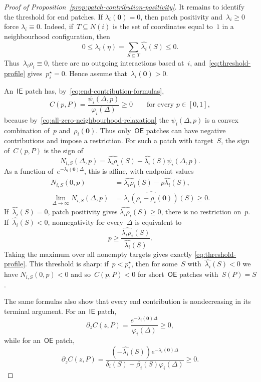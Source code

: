 \documentclass[EJP,preprint,NODS,nobera]{ejpecp}
\newcommand{\bb}[1]{\left(#1\right)}
\newcommand{\mb}[1]{\mathbf{#1}}
\begin{document}
\begin{proof}[Proof of Proposition~\ref{prop:patch-contribution-positivity}]
It remains to identify the threshold for end patches. If
$\lambda_i(\mb 0)=0$, then patch positivity and~$\lambda_i\geq0$ force
$\lambda_i\equiv0$. Indeed, if~$T\subseteq N(i)$ is the set of coordinates
equal to~$1$ in a neighbourhood configuration, then
\begin{equation*}
0
\leq
\lambda_i(\eta)
=
\sum_{S\subseteq T}\widehat{\lambda_i}(S)
\leq0.
\end{equation*}
Thus~$\lambda_i\rho_i\equiv0$, there are no outgoing interactions based
at~$i$, and~\eqref{eq:threshold-profile} gives~$p_i^\star=0$. Hence assume
that~$\lambda_i(\mb 0)>0$.

An~$\mathsf{IE}$ patch has, by~\eqref{eq:end-contribution-formulas},
\begin{equation*}
C(p,P)
=
\frac{\psi_i(\Delta,p)}{\varphi_i(\Delta)}
\geq0
\qquad
\text{for every }p\in[0,1],
\end{equation*}
because by~\eqref{eq:all-zero-neighbourhood-relaxation} the
$\psi_i(\Delta,p)$ is a convex combination of~$p$ and~$\rho_i(\mb 0)$.
Thus only~$\mathsf{OE}$ patches can have negative contributions and impose a restriction. For such a patch
with target~$S$, the sign of~$C(p,P)$ is the sign of
\begin{equation*}
N_{i,S}(\Delta,p)
=
\widehat{\lambda_i\rho_i}(S)
-
\widehat{\lambda_i}(S)\psi_i(\Delta,p).
\end{equation*}
As a function of~$e^{-\lambda_i(\mb 0)\Delta}$, this is affine, with endpoint
values
\begin{align*}
N_{i,S}(0,p)
&=
\widehat{\lambda_i\rho_i}(S)
-
p\widehat{\lambda_i}(S),
\\
\lim_{\Delta\to\infty}N_{i,S}(\Delta,p)
&=
\widehat{\lambda_i\bb{\rho_i-\rho_i(\mb 0)}}(S)
\geq0.
\end{align*}
If~$\widehat{\lambda_i}(S)=0$, patch positivity gives
$\widehat{\lambda_i\rho_i}(S)\geq0$, there is no restriction on~$p$.
If~$\widehat{\lambda_i}(S)<0$, nonnegativity for every~$\Delta$ is
equivalent to
\begin{equation*}
p
\geq
\frac{\widehat{\lambda_i\rho_i}(S)}
{\widehat{\lambda_i}(S)}.
\end{equation*}
Taking the maximum over all nonempty targets gives exactly
\eqref{eq:threshold-profile}. This threshold is sharp: if~$p<p_i^\star$,
then for some~$S$ with~$\widehat{\lambda_i}(S)<0$ we have
$N_{i,S}(0,p)<0$ and so~$C(p,P)<0$ for short~$\mathsf{OE}$ patches with~$S(P)=S$.

The same formulas also show that every end contribution is nondecreasing in its
terminal argument. For an~$\mathsf{IE}$ patch,
\begin{equation*}
\partial_zC(z,P)
=
\frac{e^{-\lambda_i(\mb 0)\Delta}}{\varphi_i(\Delta)}
\geq0,
\end{equation*}
while for an~$\mathsf{OE}$ patch,
\begin{equation*}
\partial_zC(z,P)
=
\frac{
\bb{-\widehat{\lambda_i}(S)}
e^{-\lambda_i(\mb 0)\Delta}
}{
\delta_i(S)+\beta_i(S)\varphi_i(\Delta)
}
\geq0.
\end{equation*}


\end{proof}
\end{document}
